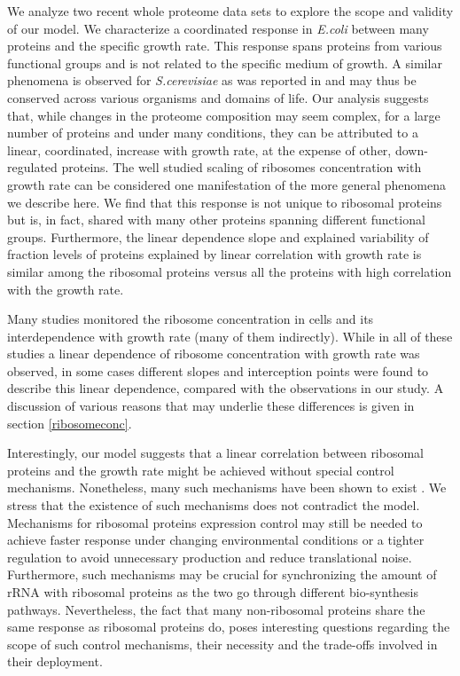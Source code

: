 \documentclass{article}
\begin{document}
We analyze two recent whole proteome data sets to explore the scope and validity of our model.
We characterize a coordinated response in \emph{E.coli} between many proteins and the specific growth rate.
This response spans proteins from various functional groups and is not related to the specific medium of growth.
A similar phenomena is observed for \emph{S.cerevisiae} as was reported in \cite{Keren2013a} and may thus be conserved across various organisms and domains of life.
Our analysis suggests that, while changes in the proteome composition may seem complex, for a large number of proteins and under many conditions, they can be attributed to a linear, coordinated, increase with growth rate, at the expense of other, down-regulated proteins.
The well studied scaling of ribosomes concentration with growth rate can be considered one manifestation of the more general phenomena we describe here.
We find that this response is not unique to ribosomal proteins but is, in fact, shared with many other proteins spanning different functional groups.
Furthermore, the linear dependence slope and explained variability of fraction levels of proteins explained by linear correlation with growth rate is similar among the ribosomal proteins versus all the proteins with high correlation with the growth rate.

Many studies monitored the ribosome concentration in cells and its interdependence with growth rate \cite{Schaechter1958,Bremer1987,Zaslaver2009,Scott2010,Valgepea2013,Peebo_2015,Hui_2015}(many of them indirectly).
While in all of these studies a linear dependence of ribosome concentration with growth rate was observed, in some cases different slopes and interception points were found to describe this linear dependence, compared with the observations in our study.
A discussion of various reasons that may underlie these differences is given in section \ref{ribosomeconc}.

Interestingly, our model suggests that a linear correlation between ribosomal proteins and the growth rate might be achieved without special control mechanisms.
Nonetheless, many such mechanisms have been shown to exist \cite{Nomura1984,25149558}.
We stress that the existence of such mechanisms does not contradict the model.
Mechanisms for ribosomal proteins expression control may still be needed to achieve faster response under changing environmental conditions or a tighter regulation to avoid unnecessary production and reduce translational noise.
Furthermore, such mechanisms may be crucial for synchronizing the amount of rRNA with ribosomal proteins as the two go through different bio-synthesis pathways.
Nevertheless, the fact that many non-ribosomal proteins share the same response as ribosomal proteins do, poses interesting questions regarding the scope of such control mechanisms, their necessity and the trade-offs involved in their deployment.
\end{document}
